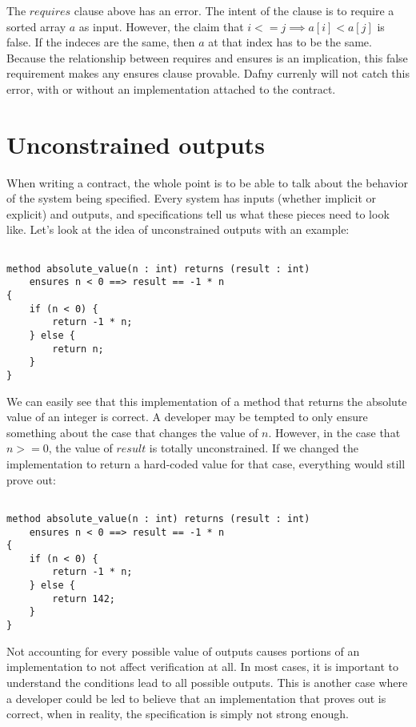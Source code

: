 \documentclass{article}
\begin{document}
The \(requires\) clause above has an error. The intent of the clause is to require a sorted array \(a\) as input.
However, the claim that \(i <= j \implies a[i] < a[j]\) is false. If the indeces are the same, then \(a\) at that
index has to be the same. Because the relationship between requires and ensures is an implication, this false requirement
makes any ensures clause provable. Dafny currenly will not catch this error, with or without an implementation attached to
the contract.

\section{Unconstrained outputs}

When writing a contract, the whole point is to be able to talk about the behavior of the system being specified.
Every system has inputs (whether implicit or explicit) and outputs, and specifications tell us what these pieces need
to look like. Let’s look at the idea of unconstrained outputs with an example:

\begin{lstlisting}

method absolute_value(n : int) returns (result : int)
    ensures n < 0 ==> result == -1 * n
{
    if (n < 0) {
        return -1 * n;
    } else {
        return n;
    }
}

\end{lstlisting}

We can easily see that this implementation of a method that returns the absolute value of an integer is correct. A developer may be
tempted to only ensure something about the case that changes the value of \(n\). However, in the case that \(n >= 0\), the value
of \(result\) is totally unconstrained. If we changed the implementation to return a hard-coded value for that case, everything
would still prove out:

\begin{lstlisting}

method absolute_value(n : int) returns (result : int)
    ensures n < 0 ==> result == -1 * n
{
    if (n < 0) {
        return -1 * n;
    } else {
        return 142;
    }
}

\end{lstlisting}

Not accounting for every possible value of outputs causes portions of an implementation to not affect verification at all. In
most cases, it is important to understand the conditions lead to all possible outputs. This is another case where a
developer could be led to believe that an implementation that proves out is correct, when in reality, the specification is
simply not strong enough.
\end{document}
